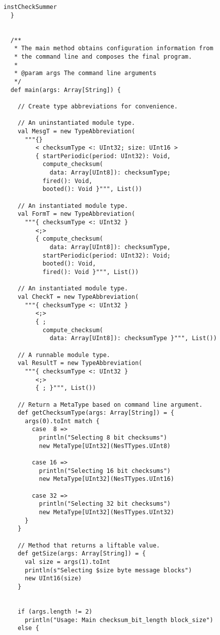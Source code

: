 \begin{lstlisting}[language=scalaness]
    instCheckSummer
  }

    
  /**
   * The main method obtains configuration information from
   * the command line and composes the final program.
   * 
   * @param args The command line arguments
   */ 
  def main(args: Array[String]) {

    // Create type abbreviations for convenience.

    // An uninstantiated module type.
    val MesgT = new TypeAbbreviation(
      """{}
         < checksumType <: UInt32; size: UInt16 >
         { startPeriodic(period: UInt32): Void,
           compute_checksum(
             data: Array[UInt8]): checksumType;
           fired(): Void,
           booted(): Void }""", List())

    // An instantiated module type.
    val FormT = new TypeAbbreviation(
      """{ checksumType <: UInt32 }
         <;>
         { compute_checksum(
             data: Array[UInt8]): checksumType,
           startPeriodic(period: UInt32): Void;
           booted(): Void,
           fired(): Void }""", List())

    // An instantiated module type.
    val CheckT = new TypeAbbreviation(
      """{ checksumType <: UInt32 }
         <;>
         { ;
           compute_checksum(
             data: Array[UInt8]): checksumType }""", List())

    // A runnable module type.
    val ResultT = new TypeAbbreviation(
      """{ checksumType <: UInt32 }
         <;>
         { ; }""", List())

    // Return a MetaType based on command line argument.
    def getChecksumType(args: Array[String]) = {
      args(0).toInt match {
        case  8 => 
          println("Selecting 8 bit checksums")   
          new MetaType[UInt32](NesTTypes.UInt8)
        
        case 16 =>
          println("Selecting 16 bit checksums") 
          new MetaType[UInt32](NesTTypes.UInt16)

        case 32 =>
          println("Selecting 32 bit checksums")
          new MetaType[UInt32](NesTTypes.UInt32)
      }
    }

    // Method that returns a liftable value.
    def getSize(args: Array[String]) = {
      val size = args(1).toInt
      println(s"Selecting $size byte message blocks")
      new UInt16(size)
    }


    if (args.length != 2)
      println("Usage: Main checksum_bit_length block_size")
    else {
 

\end{lstlisting}
